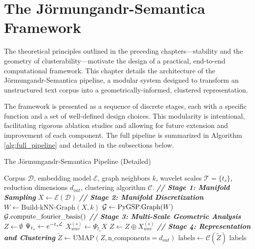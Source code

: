 \chapter{The Jörmungandr-Semantica Framework}
\label{chap:framework}

The theoretical principles outlined in the preceding chapters—stability and the geometry of clusterability—motivate the design of a practical, end-to-end computational framework. This chapter details the architecture of the Jörmungandr-Semantica pipeline, a modular system designed to transform an unstructured text corpus into a geometrically-informed, clustered representation.

The framework is presented as a sequence of discrete stages, each with a specific function and a set of well-defined design choices. This modularity is intentional, facilitating rigorous ablation studies and allowing for future extension and improvement of each component. The full pipeline is summarized in Algorithm \ref{alg:full_pipeline} and detailed in the subsections below.

\begin{algorithm}[h!]
\caption{The Jörmungandr-Semantica Pipeline (Detailed)}
\label{alg:full_pipeline}
\begin{algorithmic}[1]
\Require Corpus $\mathcal{D}$, embedding model $\mathcal{E}$, graph neighbors $k$, wavelet scales $\mathcal{T}=\{t_s\}$, reduction dimensions $d_{out}$, clustering algorithm $\mathcal{C}$.
\Statex
{}
    \State \textbf{\textit{// Stage 1: Manifold Sampling}}
    \State $X \gets \mathcal{E}(\mathcal{D})$ 
    \Statex
    \State \textbf{\textit{// Stage 2: Manifold Discretization}}
    \State $W \gets \text{Build-kNN-Graph}(X, k)$ 
    \State $\mathcal{G} \gets \text{PyGSP.Graph}(W)$ 
    \State $\mathcal{G}.\text{compute\_fourier\_basis}()$ 
    \Statex
    \State \textbf{\textit{// Stage 3: Multi-Scale Geometric Analysis}}
    \State $Z \gets \emptyset$ 
        \State $\Psi_{t_s} \gets e^{-t_s \mathcal{L}}$ 
        \State $X_{wav}^{(s)} \gets \Psi_{t_s} X$ 
        \State $Z \gets Z \oplus X_{wav}^{(s)}$ 
    \EndFor
    \Statex {}
    \Statex
    \State \textbf{\textit{// Stage 4: Representation and Clustering}}
    \State $\tilde{Z} \gets \text{UMAP}(Z, \text{n\_components}=d_{out})$ 
    \State $\text{labels} \gets \mathcal{C}(\tilde{Z})$ 
    \State \Return labels
\EndProcedure
\end{algorithmic}
\end{algorithm}


